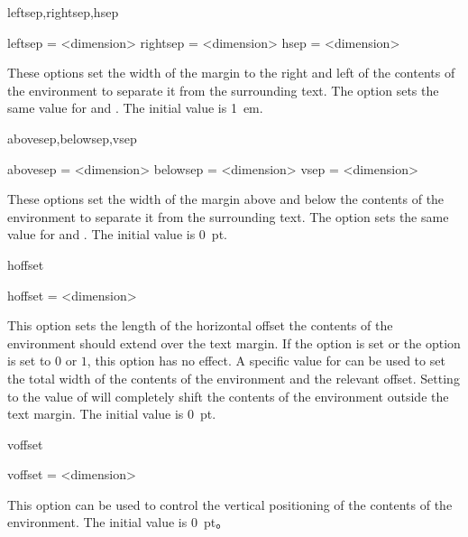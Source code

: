 \documentclass{ctxdoc}
\begin{document}
\begin{documentation}
 \begin{function}{leftsep,rightsep,hsep}
   \begin{syntax}
     leftsep  = <dimension>
     rightsep = <dimension>
     hsep     = <dimension>
   \end{syntax}
   These options set the width of the margin to the right and left of the contents of the  environment to separate it from the surrounding text. The option  sets the same value for  and . The initial value is \qty{1}{em}.
 \end{function}

 \begin{function}{abovesep,belowsep,vsep}
   \begin{syntax}
     abovesep = <dimension>
     belowsep = <dimension>
     vsep     = <dimension>
  \end{syntax}
  These options set the width of the margin above and below the contents of the  environment to separate it from the surrounding text. The option  sets the same value for  and . The initial value is \qty{0}{pt}.
 \end{function}

 \begin{function}{hoffset}
   \begin{syntax}
     hoffset = <dimension>
   \end{syntax}
   This option sets the length of the horizontal offset the contents of the  environment should extend over the text margin.
   If the option  is set or the option  is set to $0$ or $1$, this option has no effect.
   A specific value for  can be used to set the total width of the contents of the  environment and the relevant offset.
   Setting  to the value of  will completely shift the contents of the  environment outside the text margin.
   The initial value is \qty{0}{pt}.
 \end{function}

 \begin{function}{voffset}
   \begin{syntax}
     voffset = <dimension>
   \end{syntax}
   This option can be used to control the vertical positioning of the contents of the  environment.
   The initial value is \qty{0}{pt}。
 \end{function}


\end{documentation}
\end{document}
